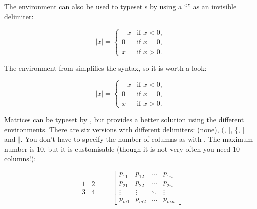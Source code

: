 The  environment can also be used to typeset s by
using a ``'' as an invisible  delimiter:
\begin{example}
\begin{equation*}
  |x| = \left\{
    \begin{array}{rl}
      -x & \text{if } x < 0,\\
      0 & \text{if } x = 0,\\
      x & \text{if } x > 0.
    \end{array} \right.
\end{equation*}
\end{example}
The  environment from  simplifies
the syntax, so it is worth a look:
\begin{example}
  \begin{equation*}
    |x| = 
    \begin{cases}
      -x & \text{if } x < 0,\\
      0 & \text{if } x = 0,\\
      x & \text{if } x > 0.
    \end{cases} 
\end{equation*}
\end{example}


Matrices can be typeset by , but
 provides a better solution using the different 
environments. There are six versions with different delimiters: 
(none),  $($,  $[$,  $\{$,  $\vert$ and
 $\Vert$. You don't have to specify the number of columns as with
. The maximum number is 10, but it is customisable (though it is not
very often you need 10 columns!):
\begin{example}
\begin{equation*}
  \begin{matrix} 
    1 & 2 \\
    3 & 4 
  \end{matrix} \qquad
  \begin{bmatrix} 
    p_{11} & p_{12} & \ldots 
    & p_{1n} \\
    p_{21} & p_{22} & \ldots 
    & p_{2n} \\
    \vdots & \vdots & \ddots 
    & \vdots \\
    p_{m1} & p_{m2} & \ldots 
    & p_{mn} 
  \end{bmatrix}
\end{equation*}
\end{example}



